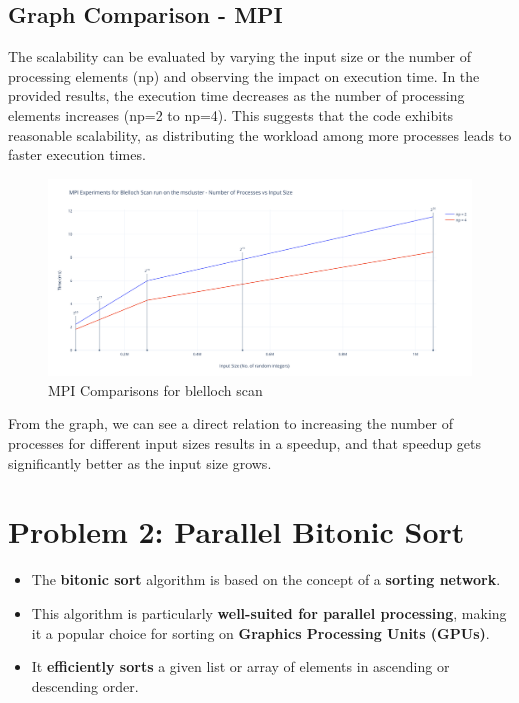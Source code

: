 \subsection{Graph Comparison - MPI}
The scalability can be evaluated by varying the input size or the number of processing elements (np) and observing the impact on execution time. In the provided results, the execution time decreases as the number of processing elements increases (np=2 to np=4). This suggests that the code exhibits reasonable scalability, as distributing the workload among more processes leads to faster execution times.

\begin{figure}[htb]
	\centering
	\includegraphics[width=0.9\linewidth]{pics/MPIGraphScan.png}
    	\caption{MPI Comparisons for blelloch scan}\label{fig:MPIGraphScan}
\end{figure}

From the graph, we can see a direct relation to increasing the number of processes for different input sizes results in a speedup, and that speedup gets significantly better as the input size grows.

\newpage

\section{Problem 2: Parallel Bitonic Sort}

\begin{itemize}
\item The \textbf{bitonic sort} algorithm is based on the concept of a \textbf{sorting network}.
\item This algorithm is particularly \textbf{well-suited for parallel processing}, making it a popular choice for sorting on \textbf{Graphics Processing Units (GPUs)}.
\item It \textbf{efficiently sorts} a given list or array of elements in ascending or descending order.
\end{itemize}

